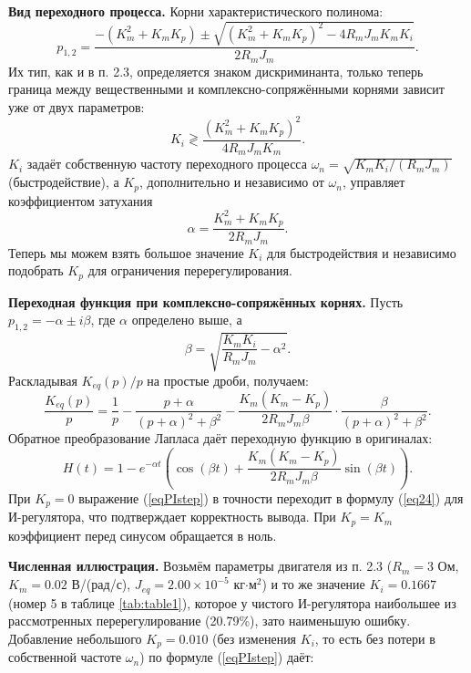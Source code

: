 \documentclass[12pt,a4paper]{extarticle}
\begin{document}
	\textbf{Вид переходного процесса.} Корни характеристического полинома:
	\begin{equation}
		p_{1,2}=\dfrac{-(K_m^2+K_mK_p)\pm\sqrt{(K_m^2+K_mK_p)^2-4R_mJ_mK_mK_i}}{2R_mJ_m}.
	\end{equation}
	Их тип, как и в п. 2.3, определяется знаком дискриминанта, только теперь граница между вещественными и комплексно-сопряжёнными корнями зависит уже от двух параметров:
	\begin{equation}
		K_i \gtrless \dfrac{(K_m^2+K_mK_p)^2}{4R_mJ_mK_m}.
	\end{equation}
	$K_i$ задаёт собственную частоту переходного процесса $\omega_n=\sqrt{K_mK_i/(R_mJ_m)}$ (быстродействие), а $K_p$, дополнительно и независимо от $\omega_n$, управляет коэффициентом затухания
	\begin{equation}
		\alpha=\dfrac{K_m^2+K_mK_p}{2R_mJ_m}.
	\end{equation}
	Теперь мы можем взять большое значение $K_i$ для быстродействия и независимо подобрать $K_p$ для ограничения перерегулирования.
	
	\textbf{Переходная функция при комплексно-сопряжённых корнях.} Пусть $p_{1,2}=-\alpha\pm i\beta$, где $\alpha$ определено выше, а
	\begin{equation}
		\beta=\sqrt{\dfrac{K_mK_i}{R_mJ_m}-\alpha^2}.
	\end{equation}
	Раскладывая $K_{eq}(p)/p$ на простые дроби, получаем:
	\begin{equation*}
		\dfrac{K_{eq}(p)}{p}=\dfrac{1}{p}-\dfrac{p+\alpha}{(p+\alpha)^2+\beta^2}-\dfrac{K_m(K_m-K_p)}{2R_mJ_m\beta}\cdot\dfrac{\beta}{(p+\alpha)^2+\beta^2}.
	\end{equation*}
	Обратное преобразование Лапласа даёт переходную функцию в оригиналах:
	\begin{equation}
		\boxed{ H(t)=1-e^{-\alpha t}\left(\cos(\beta t)+\dfrac{K_m(K_m-K_p)}{2R_mJ_m\beta}\sin(\beta t)\right)}.
		\label{eqPIstep}
	\end{equation}
	При $K_p=0$ выражение (\ref{eqPIstep}) в точности переходит в формулу (\ref{eq24}) для И-регулятора, что подтверждает корректность вывода. При $K_p=K_m$ коэффициент перед синусом обращается в ноль.
	
	\textbf{Численная иллюстрация.} Возьмём параметры двигателя из п. 2.3 ($R_m=3$ Ом, $K_m=0.02$ В/(рад/с), $J_{eq}=2.00\times10^{-5}$ кг$\cdot$м$^2$) и то же значение $K_i=0.1667$ (номер 5 в таблице \ref{tab:table1}), которое у чистого И-регулятора наибольшее из рассмотренных перерегулирование (20.79\%), зато наименьшую ошибку. Добавление небольшого $K_p=0.010$ (без изменения $K_i$, то есть без потери в собственной частоте $\omega_n$) по формуле (\ref{eqPIstep}) даёт:
	
\end{document}
